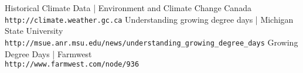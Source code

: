 \documentclass[12pt]{article}
\begin{document}
\pagebreak




\begin{thebibliography}{2}
Historical Climate Data | Environment and Climate Change Canada
\\\texttt{http://climate.weather.gc.ca}
Understanding growing degree days | Michigan State University
\\\texttt{http://msue.anr.msu.edu/news/understanding\_growing\_degree\_days}
Growing Degree Days | Farmwest
\\\texttt{http://www.farmwest.com/node/936}
\end{thebibliography}
\end{document}
